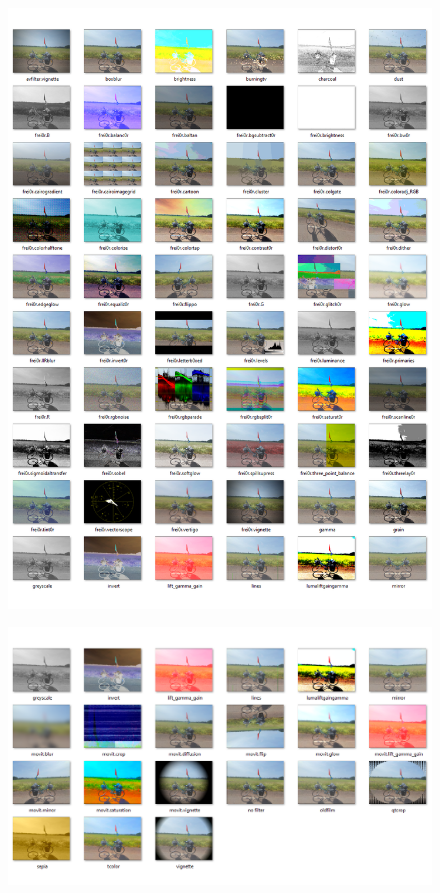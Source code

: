 \documentclass[../MasterThesis.tex]{subfiles}
\begin{document}
\begin{figure}[H]
	\includegraphics[width=1\textwidth]{Seite2.png}
\end{figure}

\begin{figure}[H]
	\includegraphics[width=1\textwidth]{Seite3.png}
\end{figure}







	
	
\end{document}
